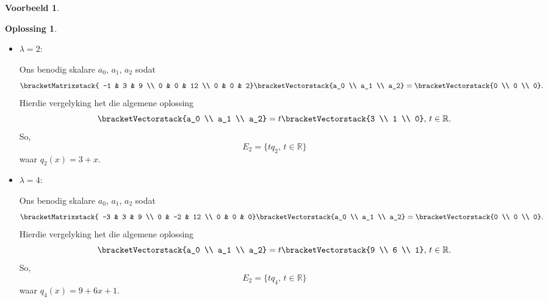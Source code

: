 \documentclass[a4paper,11pt]{book}
\theoremstyle{definition}
\newtheorem{example_environment}{Voorbeeld}[chapter]
\newtheorem*{solution}{Oplossing}
\newcommand{\cvector}[1]{\bracketVectorstack{#1}}
\newcommand{\cmatrix}[1]{\bracketMatrixstack{#1}}
\newenvironment{example}
	{
		\begin{oframed}
		\begin{example_environment}
	}
	{
		\end{example_environment}
		\end{oframed}
	}
\begin{document}
\begin{example}
\begin{solution}
\begin{itemize}
				Ons benodig skalare $a_0$, $a_1$, $a_2$ sodat
				\[
					\cmatrix{ 0 & 3 & 9 \\
					0 & 1  & 12 \\
					0 & 0 & 3} \cvector{a_0 \\ a_1 \\ a_2} = \cvector{0 \\
					0 \\ 0}.
				\]
				Die vergelyking het die algemene oplossing
				\[
					\cvector{a_0 \\ a_1 \\ a_2} = t \cvector{1 \\ 0 \\ 0},
					\, t \in \mathbb{R}.
				\]
				So,
				\[
					E_1 = \{t p_0, \, t \in \mathbb{R} \}.
				\]

			\item $\lambda = 2$:

				Ons benodig skalare $a_0$, $a_1$, $a_2$ sodat
				\[
					\cmatrix{ -1 & 3 & 9 \\
					0 & 0  & 12 \\
					0 & 0 & 2} \cvector{a_0 \\ a_1 \\ a_2} = \cvector{0 \\
					0 \\ 0}.
				\]
				Hierdie vergelyking het die algemene oplossing
				\[
					\cvector{a_0 \\ a_1 \\ a_2} = t \cvector{3 \\ 1 \\ 0},
					\, t \in \mathbb{R}.
				\]
				So,
				\[
					E_2 = \{t q_2 , \, t \in \mathbb{R} \}
				\]
				waar $q_2(x) = 3 + x$.

			\item $\lambda = 4$:

				Ons benodig skalare $a_0$, $a_1$, $a_2$ sodat
				\[
					\cmatrix{ -3 & 3 & 9 \\
					0 & -2  & 12 \\
					0 & 0 & 0} \cvector{a_0 \\ a_1 \\ a_2} = \cvector{0 \\
					0 \\ 0}.
				\]
				Hierdie vergelyking het die algemene oplossing
				\[
					\cvector{a_0 \\ a_1 \\ a_2} = t \cvector{9 \\ 6 \\ 1},
					\, t \in \mathbb{R}.
				\]
				So,
				\[
					E_2 = \{t q_4 , \, t \in \mathbb{R} \}
				\]
				waar $q_4(x) = 9 + 6x + 1$.
		\end{itemize}

	\end{solution}

\end{example}
\end{document}
